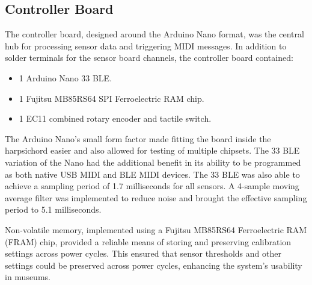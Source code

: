 \subsection{Controller Board}\label{controller-board}

The controller board, designed around the Arduino Nano format, was the central hub for processing sensor data and triggering MIDI messages. In addition to solder terminals for the sensor board channels, the controller board contained:


\begin{itemize}
    \item 1 Arduino Nano 33 BLE.
    \item 1 Fujitsu MB85RS64 SPI Ferroelectric RAM chip.
    \item 1 EC11 combined rotary encoder and tactile switch.
\end{itemize}


The Arduino Nano's small form factor made fitting the board inside the harpsichord easier and also allowed for testing of multiple chipsets. The 33 BLE variation of the Nano had the additional benefit in its ability to be programmed as both native USB MIDI and BLE MIDI devices. The 33 BLE was also able to achieve a sampling period of 1.7 milliseconds for all sensors. A 4-sample moving average filter was implemented to reduce noise and brought the effective sampling period to 5.1 milliseconds.



Non-volatile memory, implemented using a Fujitsu MB85RS64 Ferroelectric RAM (FRAM) chip, provided a reliable means of storing and preserving calibration settings across power cycles. This ensured that sensor thresholds and other settings could be preserved across power cycles, enhancing the system's usability in museums.  

